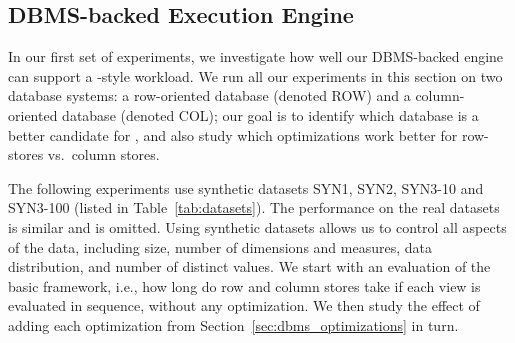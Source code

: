\subsection{DBMS-backed Execution Engine}
\label{sec:expts_dbms_execution_engine}

In our first set of experiments, we investigate 
how well our DBMS-backed engine
can support a \SeeDB-style workload.
We run all our experiments in this section on two database systems: a
row-oriented database (denoted ROW) and a
column-oriented database (denoted COL);
our goal is to identify which database is a better
candidate for \SeeDB, and also study which optimizations
work better for row-stores vs.~column stores. 

The following experiments use synthetic datasets SYN1, SYN2, SYN3-10 and
SYN3-100 (listed in Table~\ref{tab:datasets}).
The performance on the real datasets is similar and is omitted.
Using synthetic datasets allows us to control all aspects
of the data, including size, number of dimensions and measures, 
data distribution, and number of distinct values. 
We start with an evaluation of the basic framework, i.e., 
how long do row and column stores take if each view is evaluated 
in sequence, without any optimization. 
We then study the effect of adding each optimization from Section~\ref{sec:dbms_optimizations} 
in turn.



